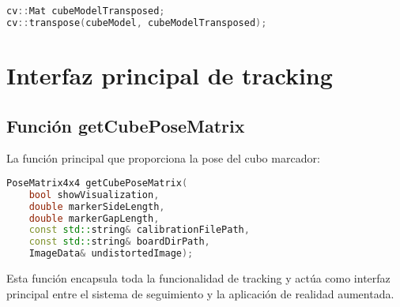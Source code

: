 \begin{lstlisting}[language=C++]
cv::Mat cubeModelTransposed;
cv::transpose(cubeModel, cubeModelTransposed);
\end{lstlisting}

\section{Interfaz principal de tracking}

\subsection{Función getCubePoseMatrix}
La función principal que proporciona la pose del cubo marcador:

\begin{lstlisting}[language=C++]
PoseMatrix4x4 getCubePoseMatrix(
    bool showVisualization,
    double markerSideLength,
    double markerGapLength,
    const std::string& calibrationFilePath,
    const std::string& boardDirPath,
    ImageData& undistortedImage);
\end{lstlisting}

Esta función encapsula toda la funcionalidad de tracking y actúa como interfaz principal entre el sistema de seguimiento y la aplicación de realidad aumentada.
